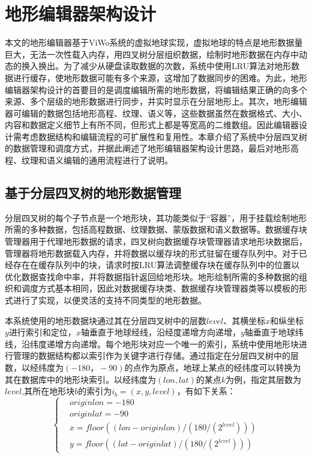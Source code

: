 
\chapter{地形编辑器架构设计}
本文的地形编辑器基于ViWo系统的虚拟地球实现，虚拟地球的特点是地形数据量巨大，无法一次性载入内存，用四叉树分层组织数据，绘制时地形数据在内存中动态的换入换出。为了减少从硬盘读取数据的次数，系统中使用LRU算法对地形数据进行缓存，使地形数据可能有多个来源，这增加了数据同步的困难。为此，地形编辑器架构设计的首要目的是调度编辑所需的地形数据，将编辑结果正确的向多个来源、多个层级的地形数据进行同步，并实时显示在分层地形上。其次，地形编辑器可编辑的数据包括地形高程、纹理、语义等，这些数据虽然在数据格式、大小、内容和数据定义细节上有所不同，但形式上都是等宽高的二维数组。因此编辑器设计需考虑数据结构和编辑流程的可扩展性和复用性。本章介绍了系统中分层四叉树的数据管理和调度方式，并据此阐述了地形编辑器架构设计思路，最后对地形高程、纹理和语义编辑的通用流程进行了说明。\par
\section{基于分层四叉树的地形数据管理}                       
分层四叉树的每个子节点是一个地形块，其功能类似于“容器”，用于挂载绘制地形所需的多种数据，包括高程数据、纹理数据、蒙版数据和语义数据等。数据缓存块管理器用于代理地形数据的请求，四叉树向数据缓存块管理器请求地形块数据后，管理器将地形数据载入内存，并将数据以缓存块的形式驻留在缓存队列中。对于已经存在在缓存队列中的块，请求时按LRU算法调整缓存块在缓存队列中的位置以优化数据查找命中率，并将数据指针返回给地形块。地形绘制所需的多种数据的组织和调度方式基本相同，因此对数据缓存块类、数据缓存块管理器类等以模板的形式进行了实现，以便灵活的支持不同类型的地形数据。\par

本系统使用的地形数据块通过其在分层四叉树中的层数$level$、其横坐标$x$和纵坐标$y$进行索引和定位，$x$轴垂直于地球经线，沿经度递增方向递增，$y$轴垂直于地球纬线，沿纬度递增方向递增。每个地形块对应一个唯一的索引，系统中使用地形块进行管理的数据结构都以索引作为关键字进行存储。通过指定在分层四叉树中的层数，以经纬度为$(-180，-90)$的点作为原点，地球上某点的经纬度可以转换为其在数据库中的地形块索引。以经纬度为$(lon,lat)$的某点$k$为例，指定其层数为$level$,其所在地形块$b$的索引为$i_b=(x,y,level)$，有如下关系：
\begin{equation}
\left\{ \begin{aligned}
&originlon=-180\\
&originlat=-90\\
&x=floor((lon-originlon)/(180/(2^{level})))\\
&y=floor((lat-originlat)/(180/(2^{level})))
\end{aligned}\right.
\end{equation}

